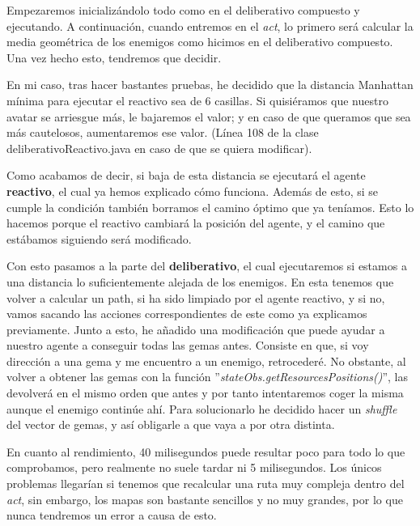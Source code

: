 \documentclass[11pt,a4paper]{article}
\begin{document}
Empezaremos inicializándolo todo como en el deliberativo compuesto y ejecutando. A continuación, cuando entremos
en el \textit{act}, lo primero será calcular la media geométrica de los enemigos como hicimos en el deliberativo
compuesto. Una vez hecho esto, tendremos que decidir.

En mi caso, tras hacer bastantes pruebas, he decidido que la distancia Manhattan mínima para ejecutar el reactivo
sea de 6 casillas. Si quisiéramos que nuestro avatar se arriesgue más, le bajaremos el valor; y en caso de que
queramos que sea más cautelosos, aumentaremos ese valor. (Línea 108 de la clase deliberativoReactivo.java en caso
de que se quiera modificar).

Como acabamos de decir, si baja de esta distancia se ejecutará el agente \textbf{reactivo}, el cual ya hemos explicado
cómo funciona. Además de esto, si se cumple la condición también borramos el camino óptimo que ya teníamos. Esto
lo hacemos porque el reactivo cambiará la posición del agente, y el camino que estábamos siguiendo será modificado.

Con esto pasamos a la parte del \textbf{deliberativo}, el cual ejecutaremos si estamos a una distancia lo
suficientemente alejada de los enemigos. En esta tenemos que volver a calcular un path, si ha sido limpiado por
el agente reactivo, y si no, vamos sacando las acciones correspondientes de este como ya explicamos previamente.
Junto a esto, he añadido una modificación que puede ayudar a nuestro agente a conseguir todas las gemas antes.
Consiste en que, si voy dirección a una gema y me encuentro a un enemigo, retrocederé. No obstante, al volver a
obtener las gemas con la función ''\textit{stateObs.getResourcesPositions()}'', las devolverá en el mismo orden que
antes y por tanto intentaremos coger la misma aunque el enemigo continúe ahí. Para solucionarlo he decidido hacer
un \textit{shuffle} del vector de gemas, y así obligarle a que vaya a por otra distinta.

En cuanto al rendimiento, 40 milisegundos puede resultar poco para todo lo que comprobamos, pero realmente no
suele tardar ni 5 milisegundos. Los únicos problemas llegarían si tenemos que recalcular una ruta muy compleja
dentro del \textit{act}, sin embargo, los mapas son bastante sencillos y no muy grandes, por lo que nunca
tendremos un error a causa de esto.
\end{document}
